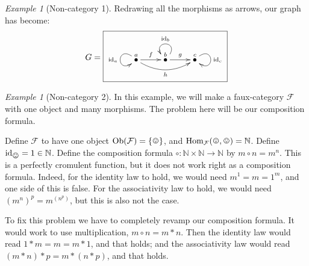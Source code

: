 \documentclass{book}
\def\tn{\textnormal}
\def\mc{\mathcal}
\def\NN{{\mathbb N}}
\def\Hom{\tn{Hom}}
\def\Ob{\tn{Ob}}
\def\singleton{\{\smiley\}}
\def\to{\rightarrow}
\def\taking{\colon}
\newcommand{\LMO}[1]{\stackrel{#1}{\bullet}}
\def\id{\tn{id}}
\def\mcF{\mc{F}}
\theoremstyle{remark}
\newtheorem{example}[subsubsection]{Example}
\theoremstyle{definition}
\begin{document}
\begin{example}[Non-category 1]
Redrawing all the morphisms as arrows, our graph has become:
$$G=\fbox{\xymatrix{\LMO{a}\ar@(ul,dl)[]_{\id_a}\ar[r]^f\ar@/_1pc/[rr]_h&\LMO{b}\ar@(ur,ul)[]_{\id_b}\ar[r]^g&\LMO{c}\ar@(ur,dr)[]^{\id_c}}}$$

\end{example}

\begin{example}[Non-category 2]

In this example, we will make a faux-category $\mcF$ with one object and many morphisms. The problem here will be our composition formula. 

Define $\mcF$ to have one object $\Ob(\mcF)=\singleton$, and $\Hom_\mcF(\smiley,\smiley)=\NN$. Define $\id_{\smiley}=1\in\NN$. Define the composition formula $\circ\taking\NN\times\NN\to\NN$ by $m\circ n=m^n$. This is a perfectly cromulent function, but it does not work right as a composition formula. Indeed, for the identity law to hold, we would need $m^1=m=1^m$, and one side of this is false. For the associativity law to hold, we would need $(m^n)^p=m^{(n^p)}$, but this is also not the case.

To fix this problem we have to completely revamp our composition formula. It would work to use multiplication, $m\circ n=m*n$. Then the identity law would read $1*m=m=m*1$, and that holds; and the associativity law would read $(m*n)*p=m*(n*p)$, and that holds.

\end{example}
\end{document}
